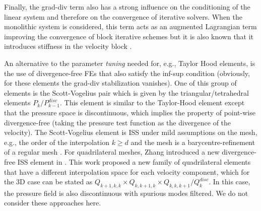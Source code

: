 
Finally, the grad-div term also has a strong influence on the conditioning of the linear system and therefore on the convergence of iterative solvers. When the monolithic system is considered, this term acts as an augmented Lagrangian term improving the convergence of block iterative schemes but it is also known that it introduces stiffness in the velocity block \cite{olshanskii_grad-div_2004,heister_efficient_2013}.

An alternative to the parameter \textit{tuning} needed for, e.g., Taylor Hood elements, is the use of divergence-free FEs that also satisfy the inf-sup condition (obviously, for these elements the grad-div stabilization vanishes). One of this group of elements is the Scott-Vogelius pair \cite{scott_conforming_1985} which is given by the triangular/tetrahedral elements $P_k/P_{k-1}^{disc}$. This element is similar to the Taylor-Hood element except that the pressure space is discontinuous, which implies the property of point-wise divergence-free (taking the pressure test function as the divergence of the velocity). The Scott-Vogelius element is ISS under mild assumptions on the mesh, e.g., the order of the interpolation $k \ge d$ and the mesh is a barycentre-refinement of a regular mesh \cite{linke_convergence_2011}. For quadrilateral meshes, Zhang introduced a new divergence-free ISS element in \cite{zhang_family_2009}. This work proposed a new family of quadrilateral elements that have a different interpolation space for each velocity component, which for the 3D case can be stated as $Q_{k+1,k,k}\times Q_{k,k+1,k}\times Q_{k,k,k+1}/Q_k^{disc}$. In this case, the pressure field is also discontinuous with spurious modes filtered. We do not consider these approaches here.

%
